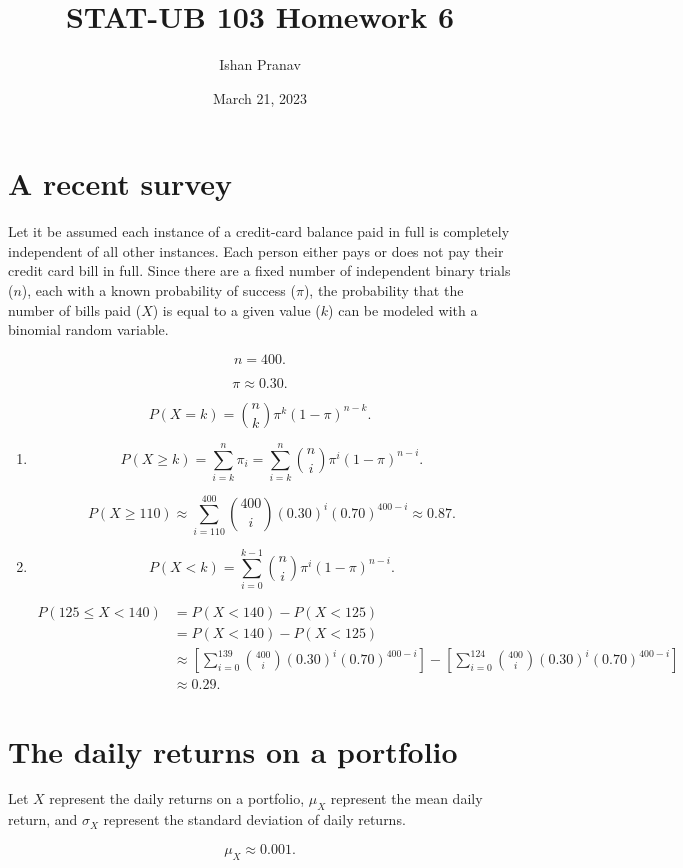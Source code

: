 \documentclass[12pt]{article}
\title{STAT-UB 103 Homework 6}
\author{Ishan Pranav}
\date{March 21, 2023}
\begin{document}
\maketitle
\section{A recent survey}
Let it be assumed each instance of a credit-card balance paid in full is completely independent of all other instances. Each person either pays or does not pay their credit card bill in full. Since there are a fixed number of independent binary trials ($n$), each with a known probability of success ($\pi$), the probability that the number of bills paid ($X$) is equal to a given value ($k$) can be modeled with a binomial random variable.

\[n=400.\]

\[\pi\approx 0.30.\]

\[P(X=k)={\binom{n}{k}}\pi^k(1-\pi)^{n-k}.\]

\begin{enumerate}
\item\[P(X\geq k)=\sum^{n}_{i=k}{\pi_i}=\sum^{n}_{i=k}{{\binom{n}{i}}\pi^i(1-\pi)^{n-i}}.\]

\[P(X\geq 110)\approx\sum^{400}_{i=110}{{\binom{400}{i}}(0.30)^i(0.70)^{400-i}}\approx 0.87.\]

\item\[P(X<k)=\sum^{k-1}_{i=0}{\binom{n}{i}\pi^i(1-\pi)^{n-i}}.\]

\begin{align*}
P(125\leq X<140)
&=P(X<140)-P(X<125)\\
&=P(X<140)-P(X<125)\\
&\approx\left[\sum^{139}_{i=0}{\binom{400}{i}(0.30)^i(0.70)^{400-i}}\right]-\left[\sum^{124}_{i=0}{\binom{400}{i}(0.30)^i(0.70)^{400-i}}\right]\\
&\approx 0.29.
\end{align*}
\end{enumerate}
\section{The daily returns on a portfolio}
Let $X$ represent the daily returns on a portfolio, $\mu_X$ represent the mean daily return, and $\sigma_X$ represent the standard deviation of daily returns.

\[\mu_X\approx 0.001.\]
\end{document}
